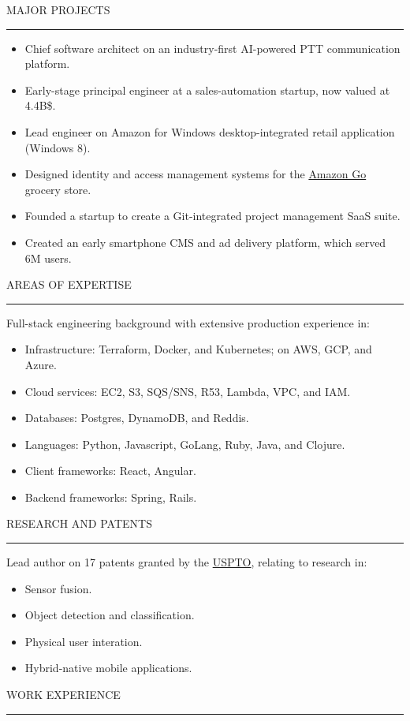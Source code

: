 \documentclass[12pt]{article}
\newcommand{\blockseparation}{\vspace{0.13in}}
\newcommand{\heading}[1]{
	\vspace{0.05in}
	\uppercase{#1}
	\vspace{0.05in}
	\hrule
	\blockseparation
}
\newcommand{\bulletheading}[1]{
	\vspace{0.075in}
	\hspace{0.175in}
	{#1}
	\vspace{0.03in}
}
\newenvironment{tightbullets}
{\begin{itemize}}
{\end{itemize}}
\newenvironment{bullets}
{\begin{tightbullets}}
{\end{tightbullets} \blockseparation}
\begin{document}
\begin{flushleft}
\heading{Major Projects}
\begin{bullets}
	\item Chief software architect on an industry-first AI-powered PTT communication platform.
	\item Early-stage principal engineer at a sales-automation startup, now valued at 4.4B\$.
	\item Lead engineer on Amazon for Windows desktop-integrated retail application (Windows 8).
	\item Designed identity and access management systems for the \href{https://www.amazon.com/b?ie=UTF8\&node=16008589011}{Amazon Go} grocery store.
	\item Founded a startup to create a Git-integrated project management SaaS suite.
	\item Created an early smartphone CMS and ad delivery platform, which served 6M users.
\end{bullets}


\heading{Areas of Expertise}
\bulletheading{Full-stack engineering background with extensive production experience in:}
\begin{bullets}
	\item Infrastructure: Terraform, Docker, and Kubernetes; on AWS, GCP, and Azure.
	\item Cloud services: EC2, S3, SQS/SNS, R53, Lambda, VPC, and IAM.
	\item Databases: Postgres, DynamoDB, and Reddis.
	\item Languages: Python, Javascript, GoLang, Ruby, Java, and Clojure.
	\item Client frameworks: React, Angular.
	\item Backend frameworks: Spring, Rails.
\end{bullets}


\heading{Research and Patents}
\bulletheading{Lead author on 17 patents granted by the \href{https://patents.google.com/?inventor=McNamara+Alexander+Michael}{USPTO}, relating to research in:}
\begin{bullets}
	\item Sensor fusion.
	\item Object detection and classification.
	\item Physical user interation.
	\item Hybrid-native mobile applications.
\end{bullets}

\pagebreak

\heading{Work Experience}
\vspace{0.05in}


\end{flushleft}
\end{document}
